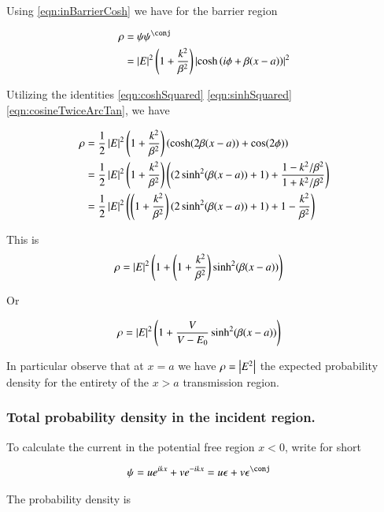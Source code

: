 \documentclass{article}
\begin{document}
Using \ref{eqn:inBarrierCosh} we have for the barrier region

\begin{align*}
\rho 
&= \psi\psi^\conj \\
&= \Abs{E}^2 
\left(1 + \frac{k^2}{\beta^2}\right) \Abs{\cosh\left( i\phi + \beta(x-a) \right) }^2
\end{align*}

Utilizing the identities \ref{eqn:coshSquared} \ref{eqn:sinhSquared} \ref{eqn:cosineTwiceArcTan}, we have

\begin{align*}
\rho 
&= \frac{1}{2} \left\lvert{E}\right\rvert^2 
\left(1 + \frac{k^2}{\beta^2}\right) \left( \cosh( 2 \beta(x-a)) + \cos(2\phi) \right) \\
&= \frac{1}{2} \left\lvert{E}\right\rvert^2 
\left(1 + \frac{k^2}{\beta^2}\right) \left( (2 \sinh^2( \beta(x-a)) + 1) + \frac{1 - k^2/\beta^2}{1 + k^2/\beta^2}\right) \\
&= \frac{1}{2} \left\lvert{E}\right\rvert^2 \left(
\left(1 + \frac{k^2}{\beta^2}\right) (2 \sinh^2( \beta(x-a)) + 1) + 1 - \frac{k^2}{\beta^2} \right) \\
\end{align*}

This is
\begin{align}\label{eqn:pDensityInBarrier}
\rho
&= \left\lvert{E}\right\rvert^2 
\left( 1 + \left(1 + \frac{k^2}{\beta^2}\right) \sinh^2( \beta(x-a)) \right) 
\end{align}

Or

\begin{align}
\rho
&= \left\lvert{E}\right\rvert^2 
\left( 1 + \frac{V}{V-E_0} \sinh^2( \beta(x-a)) \right) 
\end{align}

In particular observe that at $x=a$ we have $\rho = \left\lvert{E^2}\right\rvert$ the expected probability density for the entirety 
of the $x>a$ transmission region.

\subsubsection{ Total probability density in the incident region. }

To calculate the current in the potential free region $x<0$, write for short

\begin{align}\label{eqn:forShort}
\psi 
&= u e^{ik x} + v e^{-ik x} = u \epsilon + v \epsilon^\conj
\end{align}

The probability density is
\end{document}
